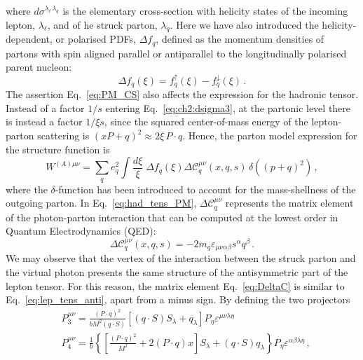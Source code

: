 where $d \sigma^{\lambda_{\ell} \, \lambda_{q}}$ is the elementary cross-section with helicity states of the incoming lepton, $\lambda_{\ell}$, and of he struck parton, $\lambda_{q}$. Here we have also introduced the helicity-dependent, or polarised PDFs, $\Delta f_{q}$, defined as the momentum densities of partons with spin aligned parallel or antiparallel to the longitudinally polarised parent nucleon:
\begin{equation}
  \Delta f_{q} (\xi) = f_{q}^{\uparrow}(\xi) - f_{q}^{\downarrow}(\xi) \,.
\end{equation}
The assertion Eq.~\eqref{eq:PM_CS} also affects the expression for the hadronic tensor. Instead of a factor $1/s$ entering Eq.~\eqref{eq:ch2:dsigma3}, at the partonic level there is instead a factor $1/\xi s$, since the squared center-of-mass energy of the lepton-parton scattering is $(xP + q)^2 \approx 2 \xi \, P \cdot q$. Hence, the parton model expression for the structure function is 
\begin{equation}
  W^{(A) \mu \nu}= \sum_{q} e_q^2\int \frac{d \xi}{\xi} \; \Delta f_{q} (\xi) \Delta \mathcal{C}^{\mu \nu}_{q} (x,q,s) \, \delta((p + q)^2) \,,
  \label{eq:had_tens_PM}
\end{equation}
where the $\delta$-function has been introduced to account for the mass-shellness of the outgoing parton. 
In Eq.~\eqref{eq:had_tens_PM}, $\Delta \mathcal{C}^{\mu \nu}_{q}$ represents the matrix element of the photon-parton interaction that can be computed at the lowest order in Quantum Electrodynamics (QED):
\begin{equation}
  \Delta \mathcal{C}_q^{\mu \nu} (x,q,s) = - 2 m_q \varepsilon_{\mu \nu \alpha \beta} s^{\alpha} q^{\beta}\,.
  \label{eq:DeltaC}
\end{equation}
We may observe that the vertex of the interaction between the struck parton and the virtual photon presents the same structure of the antisymmetric part of the lepton tensor. For this reason, the matrix element Eq.~\eqref{eq:DeltaC} is similar to Eq.~\eqref{eq:lep_tens_anti}, apart from a minus sign. By defining the two projectors
\begin{align}
  & P_3^{\mu \nu} = \frac{(P \cdot q)^2}{b M^2 (q \cdot S)} \left[ (q \cdot S) S_{\lambda} + q_{\lambda}  \right] P_{\eta} \varepsilon^{\mu \nu \lambda \eta} 
  \\
  & P_4^{\mu \nu} = \frac{1}{b} \left\{ \left[ \frac{(P\cdot q)^2}{M^2} + 2 (P \cdot q) x \right]S_{\lambda} + (q \cdot S)q_{\lambda} \right\} P_{\eta} \varepsilon^{\alpha \beta \lambda \eta}\,,
\end{align}
